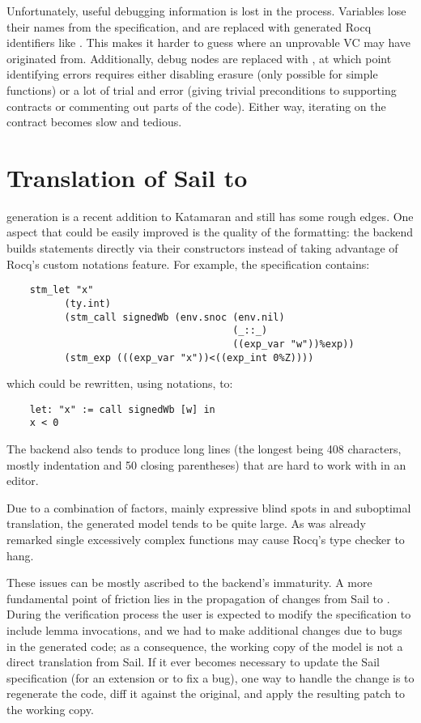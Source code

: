 Unfortunately, useful debugging information is lost in the process. Variables lose their names from the \usail specification, and are replaced with generated Rocq identifiers like . This makes it harder to guess where an unprovable VC may have originated from. Additionally, debug nodes are replaced with , at which point identifying errors requires either disabling erasure (only possible for simple functions) or a lot of trial and error (\eg giving trivial preconditions to supporting contracts or commenting out parts of the code). Either way, iterating on the contract becomes slow and tedious.

\section{Translation of Sail to \usail}

\usail generation is a recent addition to Katamaran and still has some rough edges. One aspect that could be easily improved is the quality of the formatting: the backend builds \usail statements directly via their constructors instead of taking advantage of Rocq's custom notations feature. For example, the \msp \usail specification contains:
\begin{verbatim}
    stm_let "x"
          (ty.int)
          (stm_call signedWb (env.snoc (env.nil)
                                       (_::_)
                                       ((exp_var "w"))%exp))
          (stm_exp (((exp_var "x"))<((exp_int 0%Z))))
\end{verbatim}
which could be rewritten, using notations, to:
\begin{verbatim}
    let: "x" := call signedWb [w] in
    x < 0
\end{verbatim}

The backend also tends to produce long lines (the longest being 408 characters, mostly indentation and 50 closing parentheses) that are hard to work with in an editor.

Due to a combination of factors, mainly expressive blind spots in \usail and suboptimal translation, the generated model tends to be quite large. As was already remarked single excessively complex functions may cause Rocq's type checker to hang.

These issues can be mostly ascribed to the backend's immaturity. A more fundamental point of friction lies in the propagation of changes from Sail to \usail. During the verification process the user is expected to modify the \usail specification to include lemma invocations, and we had to make additional changes due to bugs in the generated code; as a consequence, the working copy of the \usail model is not a direct translation from Sail. If it ever becomes necessary to update the Sail specification (\eg for an extension or to fix a bug), one way to handle the change is to regenerate the \usail code, diff it against the original, and apply the resulting patch to the working copy.

